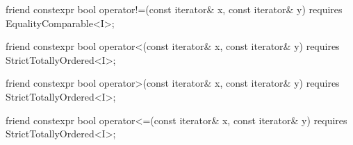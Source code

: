 \begin{itemdescr}
\pnum
\oldtxt{\returns} 
\end{itemdescr}

\begin{itemdecl}
friend constexpr bool operator!=(const iterator& x, const iterator& y)
  requires EqualityComparable<I>;
\end{itemdecl}

\begin{itemdescr}
\pnum
\oldtxt{\returns} 
\end{itemdescr}

\begin{itemdecl}
friend constexpr bool operator<(const iterator& x, const iterator& y)
  requires StrictTotallyOrdered<I>;
\end{itemdecl}

\begin{itemdescr}
\pnum
\oldtxt{\returns} 
\end{itemdescr}

\begin{itemdecl}
friend constexpr bool operator>(const iterator& x, const iterator& y)
  requires StrictTotallyOrdered<I>;
\end{itemdecl}

\begin{itemdescr}
\pnum
\oldtxt{\returns} 
\end{itemdescr}

\begin{itemdecl}
friend constexpr bool operator<=(const iterator& x, const iterator& y)
  requires StrictTotallyOrdered<I>;
\end{itemdecl}

\begin{itemdescr}
\pnum
\oldtxt{\returns} 
\end{itemdescr}

